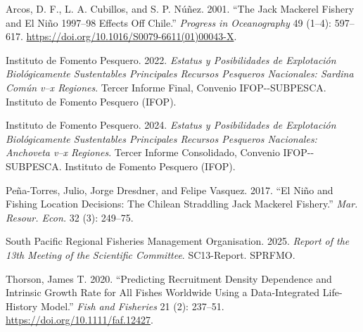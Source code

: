\documentclass[
  11pt,
]{article}
\newlength{\cslhangindent}
\newenvironment{CSLReferences}[2] %
 {\begin{list}{}{%
  \setlength{\itemindent}{0pt}
  \setlength{\leftmargin}{0pt}
  \setlength{\parsep}{0pt}
  \ifodd #1
   \setlength{\leftmargin}{\cslhangindent}
   \setlength{\itemindent}{-1\cslhangindent}
  \fi
  \setlength{\itemsep}{#2\baselineskip}}}
 {\end{list}}
\begin{document}
\protect{}\label{refs}
\begin{CSLReferences}{1}{1}
Arcos, D. F., L. A. Cubillos, and S. P. Núñez. 2001. {``The Jack Mackerel Fishery and {El Ni{ñ}o} 1997--98 Effects Off {Chile}.''} \emph{Progress in Oceanography} 49 (1--4): 597--617. \url{https://doi.org/10.1016/S0079-6611(01)00043-X}.

Instituto de Fomento Pesquero. 2022. \emph{Estatus y Posibilidades de Explotación Biológicamente Sustentables Principales Recursos Pesqueros Nacionales: Sardina Común v--x Regiones}. Tercer Informe Final, Convenio IFOP-\/-SUBPESCA. Instituto de Fomento Pesquero (IFOP).

Instituto de Fomento Pesquero. 2024. \emph{Estatus y Posibilidades de Explotación Biológicamente Sustentables Principales Recursos Pesqueros Nacionales: Anchoveta v--x Regiones}. Tercer Informe Consolidado, Convenio IFOP-\/-SUBPESCA. Instituto de Fomento Pesquero (IFOP).

Peña-Torres, Julio, Jorge Dresdner, and Felipe Vasquez. 2017. {``El Niño and Fishing Location Decisions: The Chilean Straddling Jack Mackerel Fishery.''} \emph{Mar. Resour. Econ.} 32 (3): 249--75.

South Pacific Regional Fisheries Management Organisation. 2025. \emph{Report of the 13th Meeting of the Scientific Committee}. SC13-Report. SPRFMO.

Thorson, James T. 2020. {``Predicting Recruitment Density Dependence and Intrinsic Growth Rate for All Fishes Worldwide Using a Data-Integrated Life-History Model.''} \emph{Fish and Fisheries} 21 (2): 237--51. \url{https://doi.org/10.1111/faf.12427}.

\end{CSLReferences}
\end{document}
